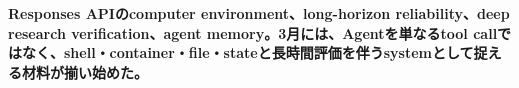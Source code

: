 \noindent\textbf{Responses APIのcomputer environment、long-horizon reliability、deep research verification、agent memory。3月には、Agentを単なるtool callではなく、shell・container・file・stateと長時間評価を伴うsystemとして捉える材料が揃い始めた。}\autocite{src-01572b4c34e9,src-0ec537ec1cc1,src-2b8b39e5cae3,src-42318ebdee75}
